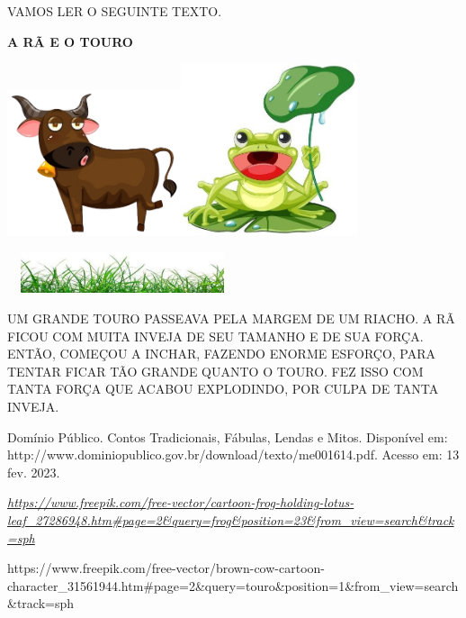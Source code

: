 VAMOS LER O SEGUINTE TEXTO.

\textbf{A RÃ E O TOURO}

\includegraphics[width=2.01214in,height=1.68750in]{media/image160.png}\includegraphics[width=2.04167in,height=1.99274in]{media/image161.jpg}

\includegraphics[width=2.66528in,height=0.47292in]{media/image162.jpg}

UM GRANDE TOURO PASSEAVA PELA MARGEM DE UM RIACHO. A RÃ FICOU COM MUITA
INVEJA DE SEU TAMANHO E DE SUA FORÇA. ENTÃO, COMEÇOU A INCHAR, FAZENDO
ENORME ESFORÇO, PARA TENTAR FICAR TÃO GRANDE QUANTO O TOURO. FEZ ISSO
COM TANTA FORÇA QUE ACABOU EXPLODINDO, POR CULPA DE TANTA INVEJA.

Domínio Público. Contos Tradicionais, Fábulas, Lendas e Mitos. Disponível
em: http://www.dominiopublico.gov.br/download/texto/me001614.pdf.
Acesso em: 13 fev. 2023.

\href{https://www.freepik.com/free-vector/cartoon-frog-holding-lotus-leaf_27286948.htm\#page=2\&query=frog\&position=23\&from_view=search\&track=sph}{\emph{https://www.freepik.com/free-vector/cartoon-frog-holding-lotus-leaf\_27286948.htm\#page=2\&query=frog\&position=23\&from\_view=search\&track=sph}}

https://www.freepik.com/free-vector/brown-cow-cartoon-character\_31561944.htm\#page=2\&query=touro\&position=1\&from\_view=search\&track=sph

